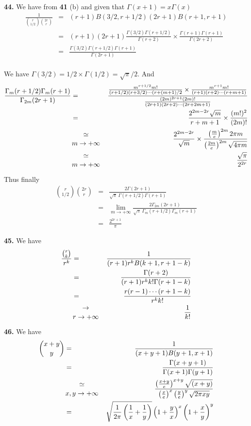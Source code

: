 \documentclass[a4paper,12pt]{article}
\newcommand{\newpar}[1]{\bigskip \noindent \textbf{#1.}}
\begin{document}
\newpar{44} We have from \textbf{41} (b) and given that $\Gamma(x+1) =
x\Gamma(x)$
\begin{eqnarray*}
  \frac{1}{{r \choose 1/2} {2r \choose r}} &=&
  (r+1)B(3/2,r+1/2)(2r+1)B(r+1, r+1) \\
  &=& (r+1)(2r+1)
  \frac{\Gamma(3/2)\Gamma(r+1/2)}{\Gamma(r+2)}\times\frac{\Gamma(r+1)\Gamma(r+1)}{\Gamma(2r+2)}
  \\ &=& \frac{\Gamma(3/2)\Gamma(r+1/2) \Gamma(r+1)}{\Gamma(2r+1)} \\
\end{eqnarray*}

We have $\Gamma(3/2) = 1/2 \times \Gamma(1/2) = \sqrt{\pi}/2$.  And
\begin{eqnarray*}
  \frac{\Gamma_m(r+1/2)\Gamma_m(r+1)}{\Gamma_{2m}(2r+1)} &=&
  \frac{\frac{m^{r+1/2}m!}{(r+1/2)(r+3/2)\cdots(r+(m+1)/2} \times
    \frac{m^{r+1}m!}{(r+1)(r+2)\cdots(r+m+1)}}
       {\frac{(2m)^{2r+1}(2m)!}{(2r+1)(2r+2)\cdots(2r+2m+1)}} \\
       &=& \frac{2^{2m-2r}\sqrt{m}}{r+m+1} \times
       \frac{(m!)^2}{(2m)!}\\
       &{\simeq \atop m \to +\infty}& \frac{2^{2m-2r}}{\sqrt{m}}\times
       \frac{\left(\frac{m}{e}\right)^{2m} 2 \pi
         m}{\left(\frac{2m}{e}\right)^{2m} \sqrt{4\pi m}} \\
       &{\simeq \atop m \to +\infty}& \frac{\sqrt{\pi}}{2^{2r}}
\end{eqnarray*}

Thus finally
\begin{eqnarray*}
  {r \choose 1/2}{2r \choose r} &=&
  \frac{2\Gamma(2r+1)}{\sqrt{\pi}\ \Gamma(r+1/2)\Gamma(r+1)} \\
  &=& \lim_{m \to +\infty}
  \frac{2\Gamma_{2m}(2r+1)}{\sqrt{\pi}\ \Gamma_m(r+1/2)\Gamma_m(r+1)}
\\
&=& \frac{2^{2r+1}}{\pi}
\end{eqnarray*}

\newpar{45} We have
\begin{eqnarray*}
  \frac{{r \choose k}}{r^k} &=& \frac{1}{(r+1)r^kB(k+1, r+1-k)} \\
  &=& \frac{\Gamma(r+2)}{(r+1)r^kk!\Gamma(r+1-k)} \\
  &=& \frac{r(r-1)\cdots(r+1-k)}{r^kk!} \\
  &{\to \atop r \to +\infty}& \frac{1}{k!}
\end{eqnarray*}

\newpar{46} We have
\begin{eqnarray*}
  {x+y \choose y} &=& \frac{1}{(x+y+1)B(y+1, x+1)} \\
  &=& \frac{\Gamma(x+y+1)}{\Gamma(x+1)\Gamma(y+1)} \\
  &{\simeq \atop x,y \to +\infty}&
  \frac{\left(\frac{x+y}{e}\right)^{x+y}\sqrt{(x+y)}}{\left(\frac{x}{e}\right)^{x}\left(\frac{y}{e}\right)^{y}
    \sqrt{2\pi x y}} \\
  &=& \sqrt{\frac{1}{2\pi}\left(\frac{1}{x}+\frac{1}{y}\right)}
  \left(1 + \frac{y}{x}\right)^x   \left(1 + \frac{x}{y}\right)^y
\end{eqnarray*}
\end{document}
